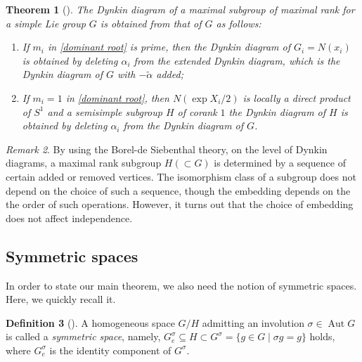 \documentclass{amsart}
\newtheorem{theorem}{Theorem}[section]
\theoremstyle{definition}
\newtheorem{definition}[theorem]{Definition}
\theoremstyle{remark}
\newtheorem{remark}[theorem]{Remark}
\numberwithin{equation}{section}
\DeclareMathOperator{\Aut}{Aut}
\newcommand{\lb}{\lbrace}
\newcommand{\rb}{\rbrace}
\begin{document}
\begin{theorem}[{\cite[Thm 7.16]{MiTo}}]
\label{thm:BdS}
The Dynkin diagram of a maximal subgroup of maximal rank for a simple Lie group $G$ is obtained from that of $G$ as follows:
\begin{enumerate}
\item If $m_{i}$ in \eqref{dominant root} is prime, then the Dynkin diagram of $G_{i}=N(x_{i})$ is obtained by deleting $\alpha_{i}$ from the extended Dynkin diagram, which is the Dynkin diagram of $G$ with $-\widetilde{\alpha}$ added;
\item If $m_{i}=1$ in \eqref{dominant root}, then $N(\exp X_{i}/2)$ is locally a direct product of $S^{1}$ and a semisimple subgroup $H$ of corank $1$ the Dynkin diagram of $H$ is obtained by deleting $\alpha_{i}$ from the Dynkin diagram of $G$.
\end{enumerate}
\end{theorem}

\begin{remark}
By using the Borel-de Siebenthal theory,
on the level of Dynkin diagrams, a maximal rank subgroup $H(\subset G)$ is determined by a sequence of certain added or removed vertices.
The isomorphism class of a subgroup does not depend on the choice of such a sequence, 
though the embedding depends on the the order of such operations.
However, it turns out that the choice of embedding does not affect independence.
\end{remark}


\subsection{Symmetric spaces}
\label{sect:2.5}

In order to state our main theorem, we also need the notion of symmetric spaces. Here, we quickly recall it.

\begin{definition}[{\cite[Chapter III, Section 6]{MiTo}}]
A homogeneous space $G/H$ admitting an involution $\sigma\in\Aut G$ is called a \textit{symmetric space}, namely, $G^{\sigma}_{e}\subseteq H\subset G^{\sigma}=\lb g\in G\mid \sigma g=g\rb$ holds, where $G^{\sigma}_{e}$ is the identity component of $G^{\sigma}$.
\end{definition}
\end{document}
